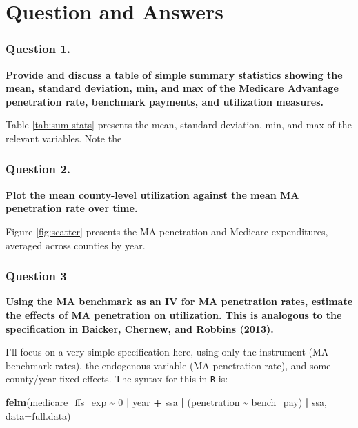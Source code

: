 \documentclass[
  12pt,
]{article}
\newenvironment{Shaded}{\begin{snugshade}}{\end{snugshade}}
\newcommand{\DataTypeTok}[1]{\textcolor[rgb]{0.13,0.29,0.53}{#1}}
\newcommand{\DecValTok}[1]{\textcolor[rgb]{0.00,0.00,0.81}{#1}}
\newcommand{\KeywordTok}[1]{\textcolor[rgb]{0.13,0.29,0.53}{\textbf{#1}}}
\newcommand{\NormalTok}[1]{#1}
\newcommand{\OperatorTok}[1]{\textcolor[rgb]{0.81,0.36,0.00}{\textbf{#1}}}
\newcommand{\StringTok}[1]{\textcolor[rgb]{0.31,0.60,0.02}{#1}}
\begin{document}
\hypertarget{question-and-answers}{%
\section{Question and Answers}\label{question-and-answers}}

\hypertarget{question-1.}{%
\subsubsection{Question 1.}\label{question-1.}}

\textbf{Provide and discuss a table of simple summary statistics showing the mean, standard deviation, min, and max of the Medicare Advantage penetration rate, benchmark payments, and utilization measures.}

Table \ref{tab:sum-stats} presents the mean, standard deviation, min, and max of the relevant variables. Note the

\hypertarget{question-2.}{%
\subsubsection{Question 2.}\label{question-2.}}

\textbf{Plot the mean county-level utilization against the mean MA penetration rate over time.}

Figure \ref{fig:scatter} presents the MA penetration and Medicare expenditures, averaged across counties by year.

\hypertarget{question-3}{%
\subsubsection{Question 3}\label{question-3}}

\textbf{Using the MA benchmark as an IV for MA penetration rates, estimate the effects of MA penetration on utilization. This is analogous to the specification in Baicker, Chernew, and Robbins (2013).}

I'll focus on a very simple specification here, using only the instrument (MA benchmark rates), the endogenous variable (MA penetration rate), and some county/year fixed effects. The syntax for this in \texttt{R} is:

\begin{Shaded}
\begin{Highlighting}[]
\KeywordTok{felm}\NormalTok{(medicare\_ffs\_exp }\OperatorTok{\textasciitilde{}}\StringTok{ }\DecValTok{0} \OperatorTok{|}\StringTok{ }\NormalTok{year }\OperatorTok{+}\StringTok{ }\NormalTok{ssa }\OperatorTok{|}\StringTok{ }\NormalTok{(penetration }\OperatorTok{\textasciitilde{}}\StringTok{ }\NormalTok{bench\_pay) }\OperatorTok{|}\StringTok{ }\NormalTok{ssa, }
     \DataTypeTok{data=}\NormalTok{full.data)}
\end{Highlighting}
\end{Shaded}
\end{document}
